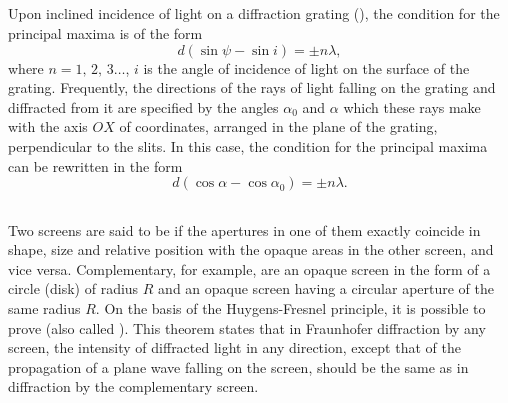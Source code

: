 \subsection{}\label{33.3.8} Upon inclined incidence of light on a diffraction grating (), the condition for the principal maxima is of the form
\begin{equation*}%
d (\sin \psi - \sin i) = \pm n \lambda,
\end{equation*}
where $n = 1,\,2, \, 3 \dots{}$, $i$ is the angle of incidence of light on the surface of the grating. Frequently, the directions of the rays of light falling on the grating and diffracted from it are specified by the angles $\alpha_{0}$ and $\alpha$ which these rays make with the axis $OX$ of coordinates, arranged in the plane of the grating, perpendicular to the slits. In this case, the condition for the principal maxima can be rewritten in the form
\begin{equation*}%
d (\cos \alpha - \cos \alpha_{0}) = \pm n \lambda.
\end{equation*}

\subsection{}\label{33.3.9} Two screens are said to be  if the apertures in one of them exactly coincide in shape, size and relative position with the opaque areas in the other screen, and vice versa. Complementary, for example, are an opaque screen in the form of a circle (disk) of radius $R$ and an opaque screen having a circular aperture of the same radius $R$. On the basis of the Huygens-Fresnel principle, it is possible to prove  (also called ). This theorem states
that in Fraunhofer diffraction by any screen, the intensity of
diffracted light in any direction, except that of the propagation of a plane wave falling on the screen, should be the same as in diffraction by the complementary screen.


